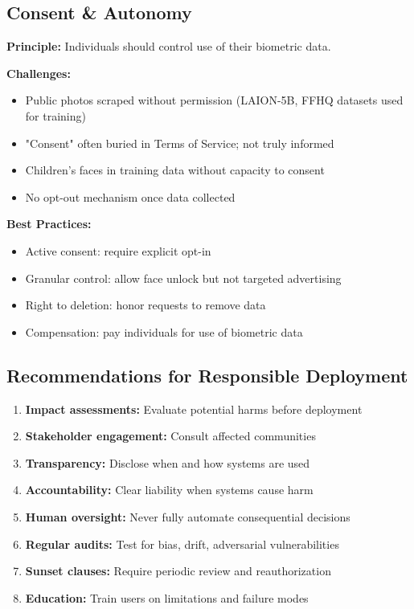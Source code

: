 \documentclass[11pt,a4paper]{article}
\begin{document}
\subsection{Consent \& Autonomy}

\textbf{Principle:} Individuals should control use of their biometric data.

\textbf{Challenges:}
\begin{itemize}
    \item Public photos scraped without permission (LAION-5B, FFHQ datasets used for training)
    \item "Consent" often buried in Terms of Service; not truly informed
    \item Children's faces in training data without capacity to consent
    \item No opt-out mechanism once data collected
\end{itemize}

\textbf{Best Practices:}
\begin{itemize}
    \item Active consent: require explicit opt-in
    \item Granular control: allow face unlock but not targeted advertising
    \item Right to deletion: honor requests to remove data
    \item Compensation: pay individuals for use of biometric data
\end{itemize}

\subsection{Recommendations for Responsible Deployment}

\begin{enumerate}
    \item \textbf{Impact assessments:} Evaluate potential harms before deployment
    \item \textbf{Stakeholder engagement:} Consult affected communities
    \item \textbf{Transparency:} Disclose when and how systems are used
    \item \textbf{Accountability:} Clear liability when systems cause harm
    \item \textbf{Human oversight:} Never fully automate consequential decisions
    \item \textbf{Regular audits:} Test for bias, drift, adversarial vulnerabilities
    \item \textbf{Sunset clauses:} Require periodic review and reauthorization
    \item \textbf{Education:} Train users on limitations and failure modes
\end{enumerate}
\end{document}
